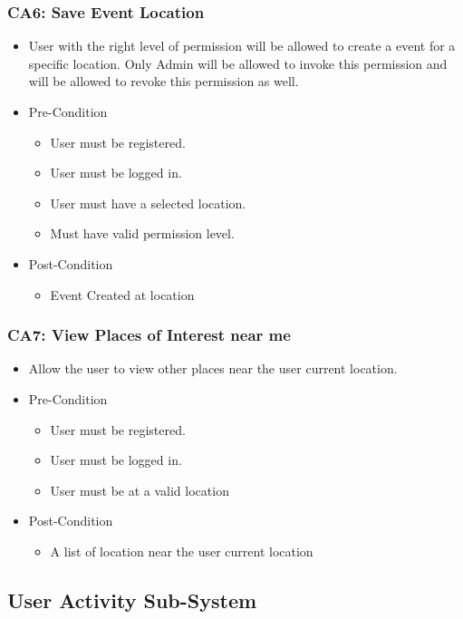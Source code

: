 \documentclass[12pt,a4paper]{article}
\begin{document}
		\subsubsection{CA6: Save Event Location}
			\begin{itemize}
				\item User with the right level of permission will be allowed to create a event for a specific location. Only Admin will be allowed to invoke this permission and will be allowed to revoke this permission as well.
				\item Pre-Condition
					\begin{itemize}
						\item User must be registered.
						\item User must be logged in.
						\item User must have a selected location.
						\item Must have valid permission level.
					\end{itemize}
				\item Post-Condition
					\begin{itemize}
						\item Event Created at location
					\end{itemize}
			\end{itemize}
		\subsubsection{CA7: View Places of Interest near me}
			\begin{itemize}
				\item Allow the user to view other places near the user current location.
				\item Pre-Condition
					\begin{itemize}
						\item User must be registered.
						\item User must be logged in.
						\item User must be at a valid location
					\end{itemize}
				\item Post-Condition
					\begin{itemize}
						\item A list of location near the user current location
					\end{itemize}
			\end{itemize}
	\subsection{User Activity Sub-System}
\end{document}
